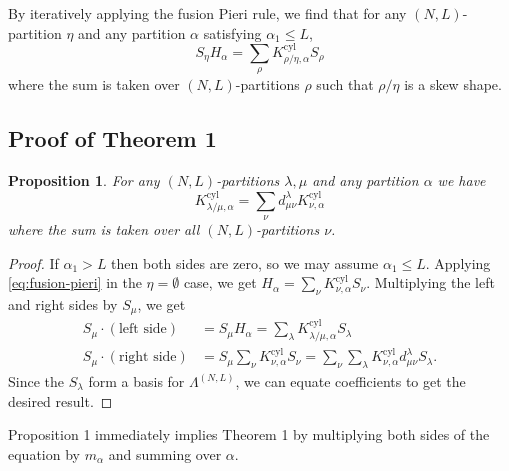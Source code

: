 \documentclass[a4paper,11pt,twoside]{amsart}
\newcommand{\cyl}{\mathrm{cyl}}
\newtheorem{theorem}{Theorem}
\newtheorem{proposition}{Proposition}
\begin{document}
By iteratively applying the fusion Pieri rule, we find that for any $(N,L)$-partition $\eta$ and any partition $\alpha$ satisfying $\alpha_1 \leq L$,
\begin{equation} \label{eq:fusion-pieri}
    S_{\eta} H_{\alpha} = \sum_{\rho} K^{\cyl}_{\rho/\eta, \alpha} S_{\rho}
\end{equation}
where the sum is taken over $(N,L)$-partitions $\rho$ such that $\rho/\eta$ is a skew shape.

\subsection{Proof of Theorem 1}

\begin{proposition}
For any $(N,L)$-partitions $\lambda,\mu$ and any partition $\alpha$ we have
\[
K^\cyl_{\lambda/\mu,\alpha} = \sum_{\nu} d^\lambda_{\mu\nu} K^\cyl_{\nu,\alpha}
\]
where the sum is taken over all $(N,L)$-partitions $\nu$.
\end{proposition}
\begin{proof}
If $\alpha_1 > L$ then both sides are zero, so we may assume $\alpha_1 \leq L$.
Applying \eqref{eq:fusion-pieri} in the $\eta=\emptyset$ case, we get $H_{\alpha} = \sum_{\nu} K^\cyl_{\nu,\alpha} S_{\nu}$. Multiplying the left and right sides by $S_{\mu}$, we get
\begin{align*}
S_\mu \cdot (\text{left side}) &= S_{\mu} H_{\alpha} = \sum_{\lambda} K^\cyl_{\lambda/\mu,\alpha} S_{\lambda} \\
S_\mu \cdot (\text{right side}) &= S_{\mu} \sum_{\nu} K^\cyl_{\nu,\alpha} S_{\nu} = \sum_{\nu} \sum_{\lambda}  K^\cyl_{\nu,\alpha} d^\lambda_{\mu\nu} S_{\lambda}.
\end{align*}
Since the $S_{\lambda}$ form a basis for $\Lambda^{(N,L)}$, we can equate coefficients to get the desired result.
\end{proof}

Proposition 1 immediately implies Theorem 1 by multiplying both sides of the equation by $m_{\alpha}$ and summing over $\alpha$.




\end{document}
